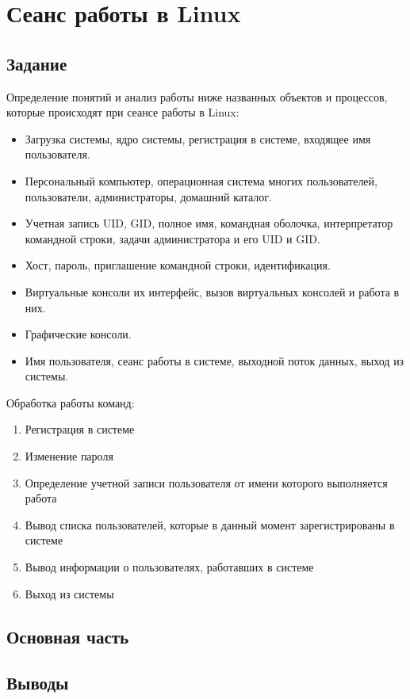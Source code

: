 \chapter{Сеанс работы в Linux}

\section{Задание}
	Определение понятий и анализ работы ниже названных объектов и процессов, которые происходят при сеансе работы в Linux:
\begin{itemize}
	\item Загрузка системы, ядро ​​системы, регистрация в системе, входящее имя пользователя.
	\item Персональный компьютер, операционная система многих пользователей, пользователи, 		администраторы, домашний каталог.
	\item Учетная запись UID, GID, полное имя, командная оболочка, интерпретатор командной 		строки, задачи администратора и его UID и GID.
	\item Хост, пароль, приглашение командной строки, идентификация.
	\item Виртуальные консоли их интерфейс, вызов виртуальных консолей и работа в них.
	\item Графические консоли.
	\item Имя пользователя, сеанс работы в системе, выходной поток данных, выход из 			системы.
\end{itemize}
Обработка работы команд:
\begin{enumerate}
\item Регистрация в системе
\item Изменение пароля
\item Определение учетной записи пользователя от имени которого выполняется работа
\item Вывод списка пользователей, которые в данный момент зарегистрированы в системе
\item Вывод информации о пользователях, работавших в системе
\item Выход из системы
\end{enumerate}
\section{Основная часть}

\section{Выводы}

